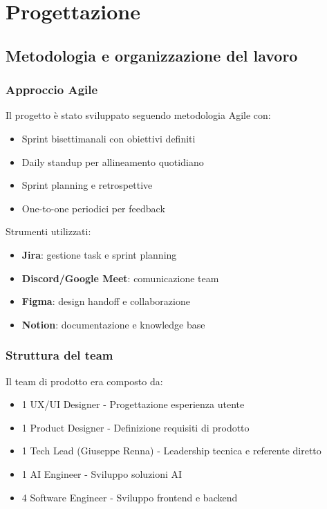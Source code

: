 \chapter{Progettazione}

\section{Metodologia e organizzazione del lavoro}
\subsection{Approccio Agile}
Il progetto è stato sviluppato seguendo metodologia Agile con:
\begin{itemize}
  \item Sprint bisettimanali con obiettivi definiti
  \item Daily standup per allineamento quotidiano
  \item Sprint planning e retrospettive
  \item One-to-one periodici per feedback
\end{itemize}

Strumenti utilizzati:
\begin{itemize}
  \item \textbf{Jira}: gestione task e sprint planning
  \item \textbf{Discord/Google Meet}: comunicazione team
  \item \textbf{Figma}: design handoff e collaborazione
  \item \textbf{Notion}: documentazione e knowledge base
\end{itemize}

\subsection{Struttura del team}
Il team di prodotto era composto da:
\begin{itemize}
  \item 1 UX/UI Designer - Progettazione esperienza utente
  \item 1 Product Designer - Definizione requisiti di prodotto
  \item 1 Tech Lead (Giuseppe Renna) - Leadership tecnica e referente diretto
  \item 1 AI Engineer - Sviluppo soluzioni AI
  \item 4 Software Engineer - Sviluppo frontend e backend
\end{itemize}

